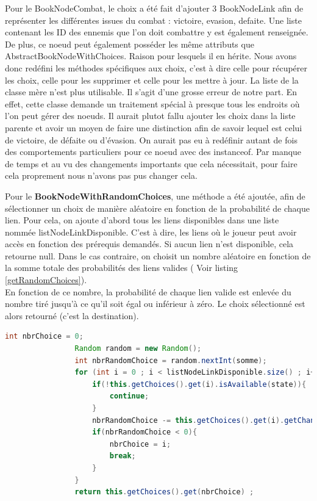 			Pour le BookNodeCombat, le choix a été fait d'ajouter 3 BookNodeLink afin de représenter les différentes issues du combat : victoire, evasion, defaite. Une liste contenant les ID des ennemis que l'on doit combattre y est également renseignée. De plus, ce noeud peut également posséder les même attributs que AbstractBookNodeWithChoices. Raison pour lesquels il en hérite. Nous avons donc redéfini les méthodes spécifiques aux choix, c'est à dire celle pour récupérer les choix, celle pour les supprimer et celle pour les mettre à jour. La liste de la classe mère n'est plus utilisable. Il s'agit d'une grosse erreur de notre part. En effet, cette classe demande un traitement spécial à presque tous les endroits où l'on peut gérer des noeuds. Il aurait plutot fallu ajouter les choix dans la liste parente et avoir un moyen de faire une distinction afin de savoir lequel est celui de victoire, de défaite ou d'évasion. On aurait pas eu à redéfinir autant de fois des comportements particuliers pour ce noeud avec des instanceof. Par manque de temps et au vu des changements importants que cela nécessitait, pour faire cela proprement nous n'avons pas pus changer cela.

			Pour le \textbf{BookNodeWithRandomChoices}, une méthode a été ajoutée, afin de sélectionner un choix de manière aléatoire en fonction de la probabilité de chaque lien. Pour cela, on ajoute d'abord tous les liens disponibles dans une liste nommée listNodeLinkDisponible. C'est à dire, les liens où le joueur peut avoir accès en fonction des prérequis demandés. Si aucun lien n'est disponible, cela retourne null. Dans le cas contraire, on choisit un nombre aléatoire en fonction de la somme totale des probabilités des liens valides ( Voir listing \ref{getRandomChoices}).\\
			En fonction de ce nombre, la probabilité de chaque lien valide est enlevée du nombre tiré jusqu'à ce qu'il soit égal ou inférieur à zéro. Le choix sélectionné est alors retourné (c'est la destination).

			\begin{lstlisting}[gobble=12, language=java, label=getRandomChoices, caption=getRandomChoice()]
				int nbrChoice = 0;
				Random random = new Random();
				int nbrRandomChoice = random.nextInt(somme);
				for (int i = 0 ; i < listNodeLinkDisponible.size() ; i++){
					if(!this.getChoices().get(i).isAvailable(state)){
						continue;
					}
					nbrRandomChoice -= this.getChoices().get(i).getChance();
					if(nbrRandomChoice < 0){
						nbrChoice = i;
						break;
					}
				}
				return this.getChoices().get(nbrChoice) ;
			\end{lstlisting}


